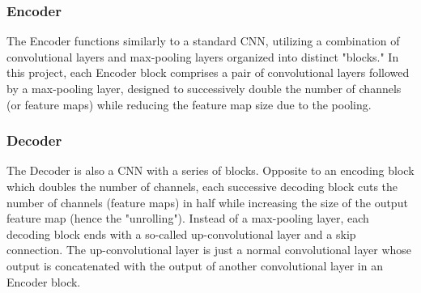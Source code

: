 \documentclass[12pt]{article}
\begin{document}
\subsubsection*{Encoder}


The Encoder functions similarly to a standard CNN, utilizing a combination of convolutional layers and max-pooling layers organized into distinct "blocks." In this project, each Encoder block comprises a pair of convolutional layers followed by a max-pooling layer, designed to successively double the number of channels (or feature maps) while 
reducing the feature map size due to the pooling.




\subsubsection*{Decoder}


The Decoder is also a CNN with a series of blocks. Opposite to an encoding block which doubles the number of channels, each successive decoding block cuts the number of channels (feature maps) in half while increasing the size of the output feature map (hence the "unrolling").
Instead of a max-pooling layer, each decoding block ends with a so-called up-convolutional layer and a skip connection. 
The up-convolutional layer is just a normal convolutional layer whose output is concatenated with the output of another convolutional layer in an Encoder block. 
\end{document}
